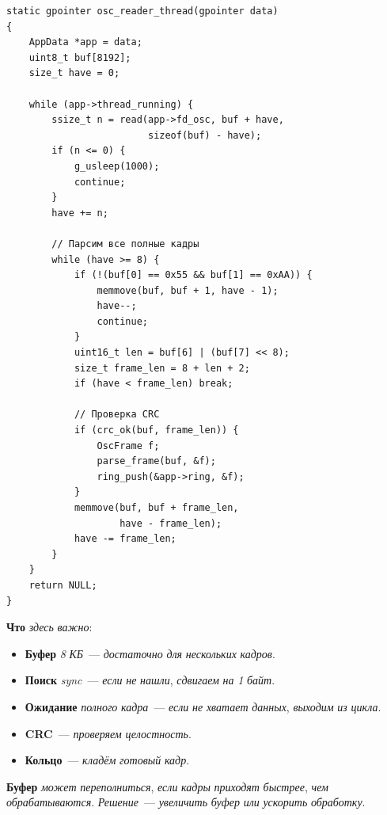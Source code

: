 \begin{listing}[htbp]
\begin{verbatim}
static gpointer osc_reader_thread(gpointer data)
{
    AppData *app = data;
    uint8_t buf[8192];
    size_t have = 0;

    while (app->thread_running) {
        ssize_t n = read(app->fd_osc, buf + have,
                         sizeof(buf) - have);
        if (n <= 0) {
            g_usleep(1000);
            continue;
        }
        have += n;

        // Парсим все полные кадры
        while (have >= 8) {
            if (!(buf[0] == 0x55 && buf[1] == 0xAA)) {
                memmove(buf, buf + 1, have - 1);
                have--;
                continue;
            }
            uint16_t len = buf[6] | (buf[7] << 8);
            size_t frame_len = 8 + len + 2;
            if (have < frame_len) break;

            // Проверка CRC
            if (crc_ok(buf, frame_len)) {
                OscFrame f;
                parse_frame(buf, &f);
                ring_push(&app->ring, &f);
            }
            memmove(buf, buf + frame_len,
                    have - frame_len);
            have -= frame_len;
        }
    }
    return NULL;
}
\end{verbatim}
\caption{\texttt{osc\_reader\_thread()}: полный цикл}
\label{lst:pc-reader-full}
\end{listing}

\textbf{Что} \emph{здесь} \emph{важно}:
\begin{itemize}
    \item \textbf{Буфер} \emph{8} \emph{КБ}~--- \emph{достаточно}
          \emph{для} \emph{нескольких} \emph{кадров}.
    \item \textbf{Поиск} \emph{sync}~--- \emph{если} \emph{не}
          \emph{нашли}, \emph{сдвигаем} \emph{на} \emph{1}
          \emph{байт}.
    \item \textbf{Ожидание} \emph{полного} \emph{кадра}~---
          \emph{если} \emph{не} \emph{хватает} \emph{данных},
          \emph{выходим} \emph{из} \emph{цикла}.
    \item \textbf{CRC}~--- \emph{проверяем} \emph{целостность}.
    \item \textbf{Кольцо}~--- \emph{кладём} \emph{готовый}
          \emph{кадр}.
\end{itemize}

\begin{warnbox}
\textbf{Буфер} \emph{может} \emph{переполниться}, \emph{если}
\emph{кадры} \emph{приходят} \emph{быстрее}, \emph{чем}
\emph{обрабатываются}. \emph{Решение}~--- \emph{увеличить}
\emph{буфер} \emph{или} \emph{ускорить} \emph{обработку}.
\end{warnbox}


